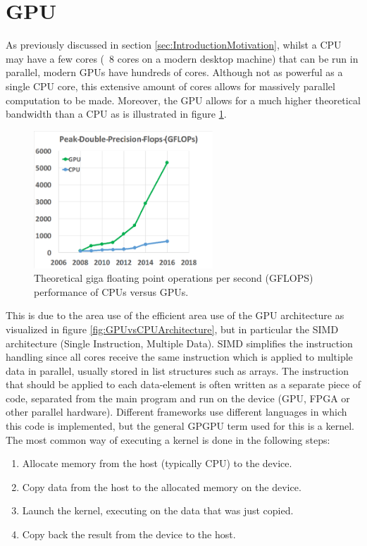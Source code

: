 \section{GPU} \label{sec:GPUTheory}
As previously discussed in section \ref{sec:IntroductionMotivation}, whilst a CPU may have a few cores (~8 cores on a modern desktop machine) that can be run in parallel, modern GPUs have hundreds of cores. Although not as powerful as a single CPU core, this extensive amount of cores allows for massively parallel computation to be made. Moreover, the GPU allows for a much higher theoretical bandwidth than a CPU as is illustrated in figure \ref{fig:GPUGFLOPS}.

\begin{figure}[!htpb]
    \centering
    \includegraphics[width=0.6\textwidth]{Theory/Figs/GFLOPSGPU.png}
    \caption{Theoretical giga floating point operations per second (GFLOPS) performance of CPUs versus GPUs. \cite{Ingemar9b}}
    \label{fig:GPUGFLOPS}
\end{figure}

\noindent This is due to the area use of the efficient area use of the GPU architecture as visualized in figure \ref{fig:GPUvsCPUArchitecture}, but in particular the SIMD architecture (Single Instruction, Multiple Data). SIMD simplifies the instruction handling since all cores receive the same instruction which is applied to multiple data in parallel, usually stored in list structures such as arrays. The instruction that should be applied to each data-element is often written as a separate piece of code, separated from the main program and run on the device (GPU, FPGA or other parallel hardware). Different frameworks use different languages in which this code is implemented, but the general GPGPU term used for this is a kernel. The most common way of executing a kernel is done in the following steps:
\begin{enumerate}
    \item Allocate memory from the host (typically CPU) to the device.
    \item Copy data from the host to the allocated memory on the device.
    \item Launch the kernel, executing on the data that was just copied.
    \item Copy back the result from the device to the host.
\end{enumerate}

